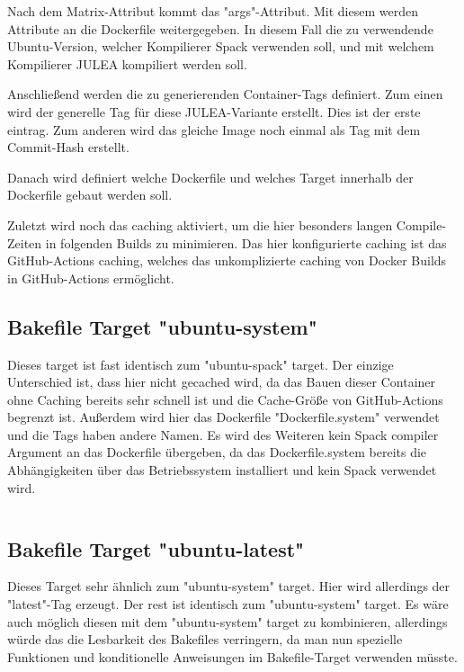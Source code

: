 Nach dem Matrix-Attribut kommt das "args"-Attribut. Mit diesem werden Attribute an die Dockerfile weitergegeben. In diesem Fall die zu verwendende Ubuntu-Version, welcher Kompilierer Spack verwenden soll, und mit welchem Kompilierer JULEA kompiliert werden soll. 

Anschließend werden die zu generierenden Container-Tags definiert. Zum einen wird der generelle Tag für diese JULEA-Variante erstellt. Dies ist der erste eintrag. Zum anderen wird das gleiche Image noch einmal als Tag mit dem Commit-Hash erstellt.

Danach wird definiert welche Dockerfile und welches Target innerhalb der Dockerfile gebaut werden soll. 

Zuletzt wird noch das caching aktiviert, um die hier besonders langen Compile-Zeiten in folgenden Builds zu minimieren. Das hier konfigurierte caching ist das GitHub-Actions caching, welches das unkomplizierte caching von Docker Builds in GitHub-Actions ermöglicht.

\subsection{Bakefile Target "ubuntu-system"}

Dieses target ist fast identisch zum "ubuntu-spack" target. Der einzige Unterschied ist, dass hier nicht gecached wird, da das Bauen dieser Container ohne Caching bereits sehr schnell ist und die Cache-Größe von GitHub-Actions begrenzt ist. Außerdem wird hier das Dockerfile "Dockerfile.system" verwendet und die Tags haben andere Namen. Es wird des Weiteren kein Spack compiler Argument an das Dockerfile übergeben, da das Dockerfile.system bereits die Abhängigkeiten über das Betriebssystem installiert und kein Spack verwendet wird. 

\inputminted[firstline=35,lastline=50]{./lexers/docker-bake-lexer.py}{./code-examples/docker-bake.hcl}

\subsection{Bakefile Target "ubuntu-latest"}

Dieses Target sehr ähnlich zum "ubuntu-system" target. Hier wird allerdings der "latest"-Tag erzeugt. 
Der rest ist identisch zum "ubuntu-system" target. Es wäre auch möglich diesen mit dem "ubuntu-system" target zu kombinieren, allerdings würde das die Lesbarkeit des Bakefiles verringern, da man nun spezielle Funktionen und konditionelle Anweisungen im Bakefile-Target verwenden müsste.

